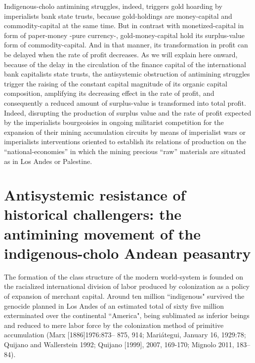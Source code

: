 \documentclass[]{interact}
\theoremstyle{plain}%
\theoremstyle{definition}
\theoremstyle{remark}
\begin{document}
Indigenous-cholo antimining struggles, indeed, triggers gold hoarding by imperialists bank state trusts, because gold-holdings are money-capital and commodity-capital at the same time. But in contrast with monetized-capital in form of paper-money -pure currency-, gold-money-capital hold its surplus-value form of commodity-capital. And in that manner, its transformation in profit can be delayed when the rate of profit decreases. As we will explain here onward, because of the delay in the circulation of the finance capital of the international bank capitalists state trusts, the antisystemic obstruction of antimining struggles trigger the raising of the constant capital magnitude of its organic capital composition, amplifying its decreasing effect in the rate of profit, and consequently a reduced amount of surplus-value is transformed into total profit. Indeed, disrupting the production of surplus value and the rate of profit expected by the imperialists bourgeoisies in ongoing militarist competition for the expansion of their mining accumulation circuits by means of imperialist wars or imperialists interventions oriented to establish its relations of production on the “national-economies” in which the mining precious “raw” materials are situated as in Los Andes or Palestine.

\section{Antisystemic resistance of historical challengers: the antimining movement of the indigenous-cholo Andean peasantry}

The formation of the class structure of the modern world-system is founded on the racialized international division of labor produced by colonization as a policy of expansion of merchant capital. Around ten million “indigenous" survived the genocide planned in Los Andes of an estimated total of sixty five million exterminated over the continental “America", being sublimated as inferior beings and reduced to mere labor force by the colonization method of primitive accumulation (Marx [1886]1976:873– 875, 914; Mariátegui, January 16, 1929:78; Quijano and Wallerstein 1992; Quijano [1999], 2007, 169-170; Mignolo 2011, 183–84).
\end{document}
